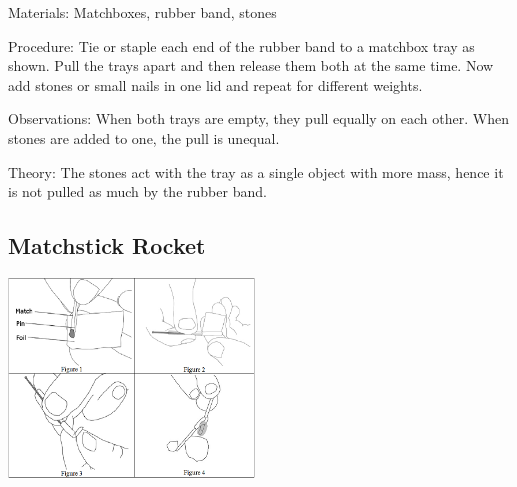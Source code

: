 \begin{multicols}{2}
\begin{description*}
\item[Materials:]{Matchboxes, rubber band, stones}
\item[Procedure:]{Tie or staple each end of the rubber band to a matchbox tray as shown. Pull the trays apart and then release them both at the same time. Now add stones or small nails in one lid and repeat for different weights.}
\item[Observations:]{When both trays are empty, they pull equally on each other. When stones are added to one, the pull is unequal.}
\item[Theory:]{The stones act with the tray as a single object with more mass, hence it is not pulled as much by the rubber band.}
\end{description*}

\subsection{Matchstick Rocket}

\begin{center}
\includegraphics[width=0.49\textwidth]{./img/matchstick-rocket-1.png}
\end{center}


\end{multicols}
